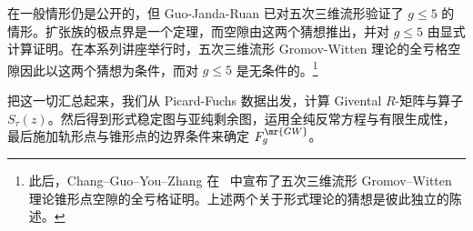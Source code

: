 \begin{rmk}
     在一般情形仍是公开的，但 Guo-Janda-Ruan 已对五次三维流形验证了 \(g \leq 5\) 的情形。扩张族的极点界是一个定理，而空隙由这两个猜想推出，并对 \(g \leq 5\) 由显式计算证明。在本系列讲座举行时，五次三维流形 Gromov-Witten 理论的全亏格空隙因此以这两个猜想为条件，而对 \(g \leq 5\) 是无条件的。\footnote{此后，Chang--Guo--You--Zhang 在~\cite{CGYZ2026} 中宣布了五次三维流形 Gromov--Witten 理论锥形点空隙的全亏格证明。上述两个关于形式理论的猜想是彼此独立的陈述。}
\end{rmk}

把这一切汇总起来，我们从 Picard-Fuchs 数据出发，计算 Givental \(R\)-矩阵与算子 \(S_{\tau}(z)\)。然后得到形式稳定图与亚纯剩余图，运用全纯反常方程与有限生成性，最后施加轨形点与锥形点的边界条件来确定 \(F_g^{\mr{GW}}\)。

